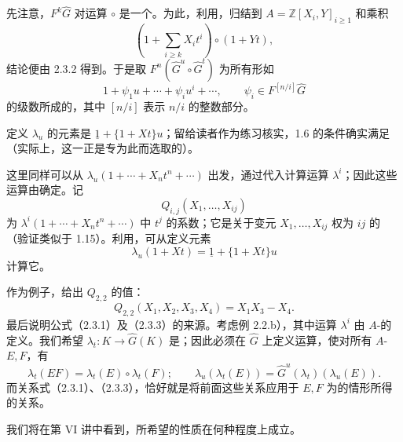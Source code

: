 先注意，$F^k\widehat G$ 对运算 $\circ$ 是一个。为此，利用，归结到 $A=\mathbb Z[X_i,Y]_{i\geqslant1}$ 和乘积
\[
\left(1+\sum_{i\geqslant k}X_it^i\right)\circ(1+Yt),
\]
结论便由 2.3.2 得到。于是取 $F^n(\widehat G^u\circ\widehat G^t)$ 为所有形如
\[
1+\psi_1u+\cdots+\psi_iu^i+\cdots,\qquad
\psi_i\in F^{[n/i]}\widehat G
\]
的级数所成的，其中 $[n/i]$ 表示 $n/i$ 的整数部分。

定义 $\lambda_u$ 的元素是 $\underline1+\{1+Xt\}u$；留给读者作为练习核实，1.6 的条件确实满足（实际上，这一正是专为此而选取的）。

这里同样可以从 $\lambda_u(1+\cdots+X_nt^n+\cdots)$ 出发，通过代入计算运算 $\lambda^i$；因此这些运算由确定。记
\[
Q_{i,j}(X_1,\ldots,X_{ij})
\]
为 $\lambda^i(1+\cdots+X_nt^n+\cdots)$ 中 $t^j$ 的系数；它是关于变元 $X_1,\ldots,X_{ij}$ 权为 $ij$ 的（验证类似于 1.15）。利用，可从定义元素
\[
\lambda_u(1+Xt)=\underline1+\{1+Xt\}u
\tag{2.3.3}
\]
计算它。

作为例子，给出 $Q_{2,2}$ 的值：
\[
Q_{2,2}(X_1,X_2,X_3,X_4)=X_1X_3-X_4.
\]
最后说明公式（2.3.1）及（2.3.3）的来源。考虑例 2.2.b），其中运算 $\lambda^i$ 由 $A$-的定义。我们希望 $\lambda_t:K\longrightarrow\widehat G(K)$ 是；因此必须在 $\widehat G$ 上定义运算，使对所有 $A$- $E,F$，有
\[
\lambda_t(EF)=\lambda_t(E)\circ\lambda_t(F);\qquad
\lambda_u(\lambda_t(E))=\widehat G^u(\lambda_t)(\lambda_u(E)).
\]
而关系式（2.3.1）、（2.3.3），恰好就是将前面这些关系应用于 $E,F$ 为的情形所得的关系。

我们将在第 VI 讲中看到，所希望的性质在何种程度上成立。

